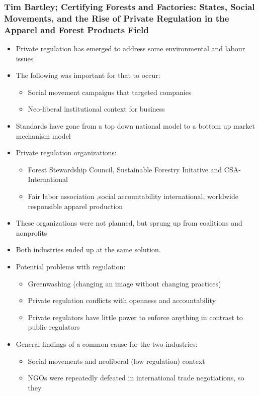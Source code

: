 \documentclass[11pt]{article}
\begin{document}
\subsubsection{Tim Bartley; Certifying Forests and Factories:  States, Social Movements, and the Rise of Private Regulation in the Apparel and Forest Products Field}
\label{sec:org062db30}
\begin{itemize}
\item Private regulation has emerged to address some environmental and labour issues
\item The following was important for that to occur:
\begin{itemize}
\item Social movement campaigns that targeted companies
\item Neo-liberal institutional context for business
\end{itemize}
\item Standards have gone from a top down national model to a bottom up market
mechanism model
\item Private regulation organizations:
\begin{itemize}
\item Forest Stewardship Council, Sustainable Forestry Initative and CSA-International
\item Fair labor association ,social accountability international, worldwide
responsible apparel production
\end{itemize}
\item These organizations were not planned, but sprung up from coalitions and nonprofits
\item Both industries ended up at the same solution.
\item Potential problems with regulation:
\begin{itemize}
\item Greenwashing (changing an image without changing practices)
\item Private regulation conflicts with openness and accountability
\item Private regulators have little power to enforce anything in contrast to
public regulators
\end{itemize}
\item General findings of a common cause for the two industries:
\begin{itemize}
\item Social movements and neoliberal (low regulation) context
\item NGOs were repeatedly defeated in international trade negotiations, so they

\end{itemize}
\end{itemize}
\end{document}
